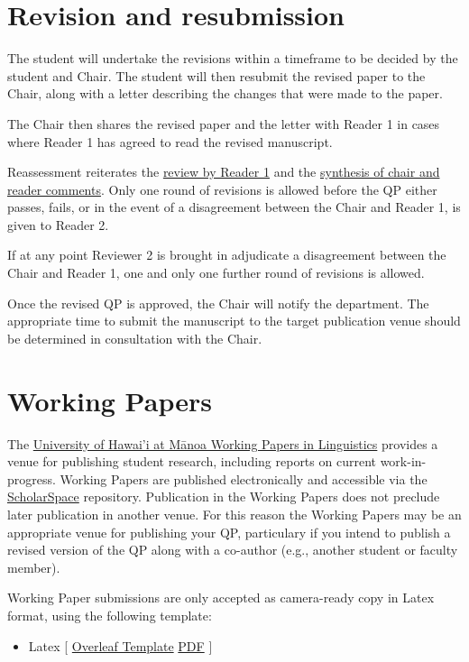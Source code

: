 \documentclass[
]{book}
\providecommand{\tightlist}{%
  \setlength{\itemsep}{0pt}\setlength{\parskip}{0pt}}
\begin{document}
\section{Revision and resubmission}\label{revisions}

The student will undertake the revisions within a timeframe to be decided by the student and Chair. The student will then resubmit the revised paper to the Chair, along with a letter describing the changes that were made to the paper.

The Chair then shares the revised paper and the letter with Reader 1 in cases where Reader 1 has agreed to read the revised manuscript.

Reassessment reiterates the \hyperref[reader1]{review by Reader 1} and the \hyperref[synthesis]{synthesis of chair and reader comments}. Only one round of revisions is allowed before the QP either passes, fails, or in the event of a disagreement between the Chair and Reader 1, is given to Reader 2.

If at any point Reviewer 2 is brought in adjudicate a disagreement between the Chair and Reader 1, one and only one further round of revisions is allowed.

Once the revised QP is approved, the Chair will notify the department. The appropriate time to submit the manuscript to the target publication venue should be determined in consultation with the Chair.

\section{Working Papers}\label{wp}

The \href{https://hdl.handle.net/10125/42386}{University of Hawai'i at Mānoa Working Papers in Linguistics} provides a venue for publishing student research, including reports on current work-in-progress. Working Papers are published electronically and accessible via the \href{https://hdl.handle.net/10125/42386}{ScholarSpace} repository. Publication in the Working Papers does not preclude later publication in another venue. For this reason the Working Papers may be an appropriate venue for publishing your QP, particulary if you intend to publish a revised version of the QP along with a co-author (e.g., another student or faculty member).

Working Paper submissions are only accepted as camera-ready copy in Latex format, using the following template:

\begin{itemize}
\tightlist
\item
  Latex {[} \href{https://www.overleaf.com/read/vrzdjgmsxpxz}{Overleaf Template} \textbar{} \href{/files/UHMWPL_latex.pdf}{PDF} {]}
\end{itemize}
\end{document}
